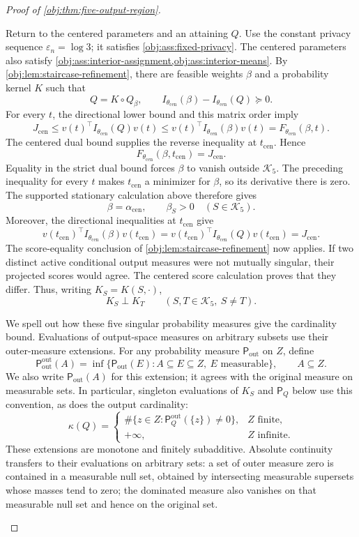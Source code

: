 \begin{proof}[Proof of \cref{obj:thm:five-output-region}]
\begin{enumerate}
Return to the centered parameters and an attaining \(Q\). Use the
constant privacy sequence \(\varepsilon_n=\log3\); it satisfies
\cref{obj:ass:fixed-privacy}. The centered parameters also satisfy
\cref{obj:ass:interior-assignment,obj:ass:interior-means}.
By \cref{obj:lem:staircase-refinement}, there are feasible weights
\(\beta\) and a probability kernel \(K\) such that
\[
Q=K\circ Q_\beta,
\qquad
I_{\theta_{\mathrm{cen}}}(\beta)-I_{\theta_{\mathrm{cen}}}(Q)\succeq0.
\]
For every \(t\), the directional lower bound and this matrix order imply
\[
J_{\mathrm{cen}}
\le
v(t)^\top I_{\theta_{\mathrm{cen}}}(Q)v(t)
\le
v(t)^\top I_{\theta_{\mathrm{cen}}}(\beta)v(t)
=
F_{\theta_{\mathrm{cen}}}(\beta,t).
\]
The centered dual bound supplies the reverse inequality at
\(t_{\mathrm{cen}}\). Hence
\[
F_{\theta_{\mathrm{cen}}}(\beta,t_{\mathrm{cen}})
=J_{\mathrm{cen}}.
\]
Equality in the strict dual bound forces \(\beta\) to vanish outside
\(\mathcal K_5\). The preceding inequality for every \(t\) makes
\(t_{\mathrm{cen}}\) a minimizer for \(\beta\), so its derivative there is
zero. The supported stationary calculation above therefore gives
\[
\beta=\alpha_{\mathrm{cen}},
\qquad
\beta_S>0\quad(S\in\mathcal K_5).
\]
Moreover, the directional inequalities at \(t_{\mathrm{cen}}\) give
\[
v(t_{\mathrm{cen}})^\top I_{\theta_{\mathrm{cen}}}(\beta)
v(t_{\mathrm{cen}})
=
v(t_{\mathrm{cen}})^\top I_{\theta_{\mathrm{cen}}}(Q)
v(t_{\mathrm{cen}})
=
J_{\mathrm{cen}}.
\]
The score-equality conclusion of
\cref{obj:lem:staircase-refinement} now applies. If two distinct active
conditional output measures were not mutually singular, their projected
scores would agree. The centered score calculation proves that they
differ. Thus, writing \(K_S=K(S,\cdot)\),
\[
K_S\perp K_T
\qquad(S,T\in\mathcal K_5,\ S\ne T).
\]

We spell out how these five singular probability measures give the
cardinality bound. Evaluations of output-space measures on arbitrary
subsets use their outer-measure extensions. For any probability measure
\(\mathsf P_{\mathrm{out}}\) on \(Z\), define
\[
\mathsf P_{\mathrm{out}}^{\mathrm{out}}(A)
=
\inf\bigl\{\mathsf P_{\mathrm{out}}(E):
A\subseteq E\subseteq Z,\ E\text{ measurable}\bigr\},
\qquad A\subseteq Z.
\]
We also write \(\mathsf P_{\mathrm{out}}(A)\) for this extension; it agrees
with the original measure on measurable sets. In particular, singleton
evaluations of \(K_S\) and \(\mathsf P_Q\) below use this convention, as
does the output cardinality:
\[
\kappa(Q)=
\begin{cases}
\#\{z\in Z:\mathsf P_Q^{\mathrm{out}}(\{z\})\ne0\},&Z\text{ finite},\\
+\infty,&Z\text{ infinite}.
\end{cases}
\]
These extensions are monotone and finitely subadditive. Absolute
continuity transfers to their evaluations on arbitrary sets: a set of
outer measure zero is contained in a measurable null set, obtained by
intersecting measurable supersets whose masses tend to zero; the
dominated measure also vanishes on that measurable null set and hence
on the original set.


\end{enumerate}
\end{proof}
